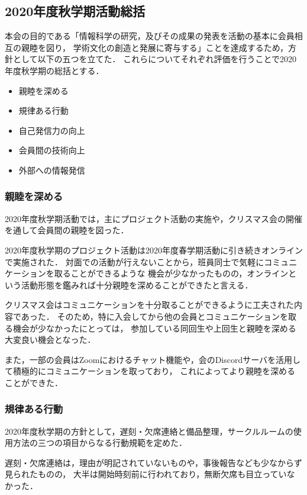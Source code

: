 \subsection*{2020年度秋学期活動総括}


本会の目的である「情報科学の研究，及びその成果の発表を活動の基本に会員相互の親睦を図り，
学術文化の創造と発展に寄与する」ことを達成するため，方針として以下の五つを立てた．
これらについてそれぞれ評価を行うことで2020年度秋学期の総括とする．

\begin{itemize}
    \item 親睦を深める
    \item 規律ある行動
    \item 自己発信力の向上
    \item 会員間の技術向上
    \item 外部への情報発信
\end{itemize}

\subsubsection*{親睦を深める}
    2020年度秋学期活動では，主にプロジェクト活動の実施や，クリスマス会の開催を通して会員間の親睦を図った．

    2020年度秋学期のプロジェクト活動は2020年度春学期活動に引き続きオンラインで実施された．
    対面での活動が行えないことから，班員同士で気軽にコミュニケーションを取ることができるような
    機会が少なかったものの，オンラインという活動形態を鑑みれば十分親睦を深めることができたと言える．

    クリスマス会はコミュニケーションを十分取ることができるように工夫された内容であった．
    そのため，特に入会してから他の会員とコミュニケーションを取る機会が少なかった\firstGrade{}にとっては，
    参加している同回生や上回生と親睦を深める大変良い機会となった．

    また，一部の会員はZoomにおけるチャット機能や，会のDiscordサーバを活用して積極的にコミュニケーションを取っており，
    これによってより親睦を深めることができた．

\subsubsection*{規律ある行動}
    2020年度秋学期の方針として，遅刻・欠席連絡と備品整理，サークルルームの使用方法の三つの項目からなる行動規範を定めた．

    遅刻・欠席連絡は，理由が明記されていないものや，事後報告なども少なからず見られたものの，
    大半は開始時刻前に行われており，無断欠席も目立っていなかった．

